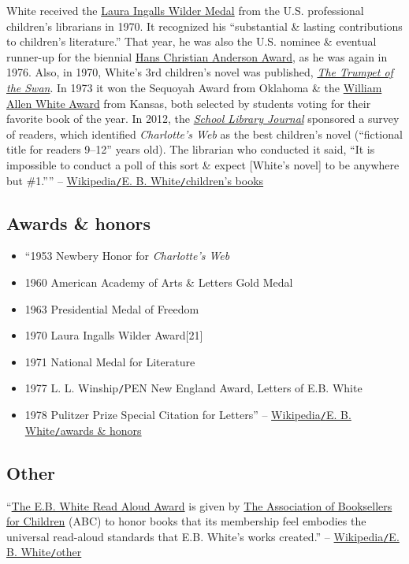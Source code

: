 \documentclass[oneside]{book}
\numberwithin{equation}{section}
\begin{document}
White received the \href{https://en.wikipedia.org/wiki/Laura_Ingalls_Wilder_Medal}{Laura Ingalls Wilder Medal} from the U.S. professional children's librarians in 1970. It recognized his ``substantial \& lasting contributions to children's literature.'' That year, he was also the U.S. nominee \& eventual runner-up for the biennial \href{https://en.wikipedia.org/wiki/Hans_Christian_Andersen_Award}{Hans Christian Anderson Award}, as he was again in 1976. Also, in 1970, White's 3rd children's novel was published, \href{https://en.wikipedia.org/wiki/The_Trumpet_of_the_Swan}{\textit{The Trumpet of the Swan}}. In 1973 it won the Sequoyah Award from Oklahoma \& the \href{https://en.wikipedia.org/wiki/William_Allen_White_Award}{William Allen White Award} from Kansas, both selected by students voting for their favorite book of the year. In 2012, the \href{https://en.wikipedia.org/wiki/School_Library_Journal}{\textit{School Library Journal}} sponsored a survey of readers, which identified \textit{Charlotte's Web} as the best children's novel (``fictional title for readers 9--12'' years old). The librarian who conducted it said, ``It is impossible to conduct a poll of this sort \& expect [White's novel] to be anywhere but \#1.'''' -- \href{https://en.wikipedia.org/wiki/E._B._White#Children's_books}{Wikipedia\texttt{/}E. B. White\texttt{/}children's books}

\subsection{Awards \& honors}
\begin{itemize}
	\item ``1953 Newbery Honor for \textit{Charlotte's Web}
	\item 1960 American Academy of Arts \& Letters Gold Medal
	\item 1963 Presidential Medal of Freedom
	\item 1970 Laura Ingalls Wilder Award[21]
	\item 1971 National Medal for Literature
	\item 1977 L. L. Winship\texttt{/}PEN New England Award, Letters of E.B. White
	\item 1978 Pulitzer Prize Special Citation for Letters'' -- \href{https://en.wikipedia.org/wiki/E._B._White#Awards_and_honors}{Wikipedia\texttt{/}E. B. White\texttt{/}awards \& honors}
\end{itemize}

\subsection{Other}
``\href{https://en.wikipedia.org/wiki/The_E.B._White_Read_Aloud_Award}{The E.B. White Read Aloud Award} is given by \href{https://en.wikipedia.org/wiki/The_Association_of_Booksellers_for_Children}{The Association of Booksellers for Children} (ABC) to honor books that its membership feel embodies the universal read-aloud standards that E.B. White's works created.'' -- \href{https://en.wikipedia.org/wiki/E._B._White#Other}{Wikipedia\texttt{/}E. B. White\texttt{/}other}
\end{document}
